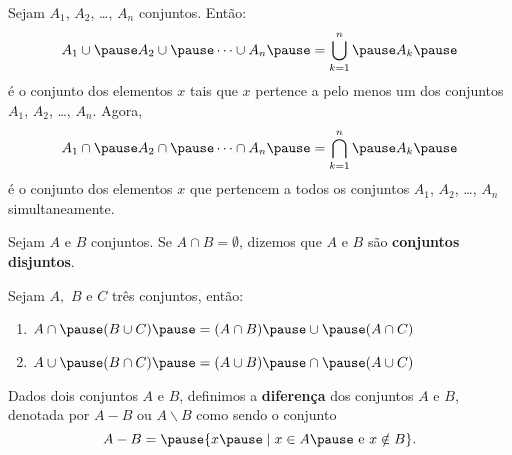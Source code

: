 \documentclass{beamer}
\begin{document}
    \begin{frame}
        \begin{definicao}
            Sejam $A_{1}$, \pause $A_2$, \pause \dots, $A_{n}$ \pause conjuntos. \pause Então:\pause
            \[
                A_{1} \cup \pause A_{2} \cup \pause \cdots \cup A_{n} \pause = \displaystyle\bigcup_{k=1}^n \pause A_{k}\pause
            \]
            é o conjunto dos elementos $x$ \pause tais que $x$ pertence a \pause pelo menos um \pause dos conjuntos $A_{1}$, \pause $A_2$, \pause \dots, $A_{n}$. \pause Agora,\pause
            \[
                A_{1} \cap \pause A_2 \cap \pause \cdots \cap A_{n} \pause = \displaystyle\bigcap_{k=1}^{n} \pause A_{k}\pause
            \]
            é o conjunto dos elementos $x$ \pause que pertencem a todos \pause os conjuntos $A_{1}$, \pause $A_2$, \pause \dots, $A_{n}$ \pause simultaneamente.
        \end{definicao}
    \end{frame}

    \begin{frame}
        \begin{definicao}
            Sejam $A$ e $B$ conjuntos. \pause Se $A \cap B = \emptyset$, \pause dizemos que $A$ e $B$ são \pause \textbf{conjuntos disjuntos}.
        \end{definicao}
    \end{frame}

    \begin{frame}
        \begin{proposicao} Sejam $A,$ $B$ e $C$ três conjuntos, \pause então:\pause
            \begin{enumerate}[label={\roman*})]
                \item $A \cap \pause ( B \cup C) \pause = (A \cap B) \pause \cup \pause (A \cap C)$\pause
                \item $A \cup \pause (B \cap C) \pause = (A \cup B) \pause \cap \pause (A \cup C)$\pause
            \end{enumerate}
        \end{proposicao}
    \end{frame}

    \begin{frame}
        \begin{definicao}
            Dados dois conjuntos $A$ e $B$, \pause definimos a \textbf{diferença} \pause dos conjuntos $A$ e $B$, denotada por \pause $A - B$ ou $A \backslash B$ \pause como sendo o conjunto\pause
            \[
                A - B = \pause \{x \pause \mid x \in A \pause \mbox{ e } x \notin B\}.
            \]
        \end{definicao}

    \end{frame}
\end{document}
